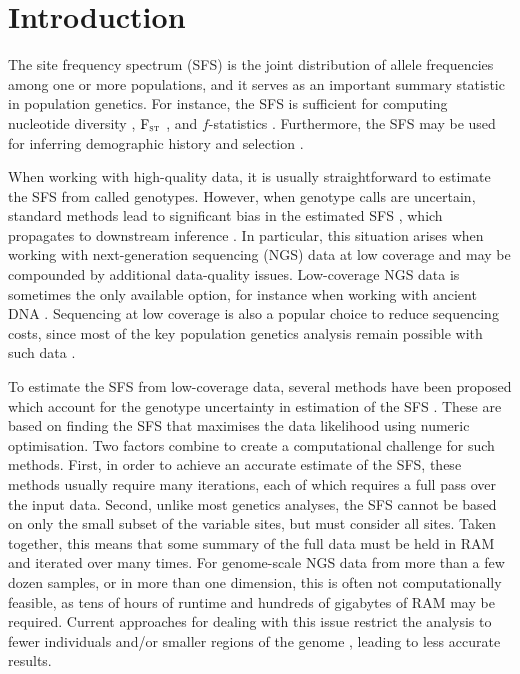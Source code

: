 \section{Introduction}

The site frequency spectrum (SFS) is the joint distribution of allele frequencies among one or more populations, and it serves as an important summary statistic in population genetics.
For instance, the SFS is sufficient for computing nucleotide diversity \cite{Korneliussen2013}, $\text{F}_{\textsc{st}}$ \cite{Bhatia2013}, and $f$-statistics \cite{Peter2016}.
Furthermore, the SFS may be used for inferring demographic history \cite{Marth2004, Gutenkunst2009, Excoffier2013} and selection \cite{Tajima1989, Fay2000, Nielsen2005}.

When working with high-quality data, it is usually straightforward to estimate the SFS from called genotypes.
However, when genotype calls are uncertain, standard methods lead to significant bias in the estimated SFS \cite{Nielsen2011}, which propagates to downstream inference \cite{Han2013}.
In particular, this situation arises when working with next-generation sequencing (NGS) data at low coverage and may be compounded by additional data-quality issues.
Low-coverage NGS data is sometimes the only available option, for instance when working with ancient DNA \cite{Olalde2019,Margaryan2020,vanderValk2021}.
Sequencing at low coverage is also a popular choice to reduce sequencing costs, since most of the key population genetics analysis remain possible with such data \cite{Lou2021}.

To estimate the SFS from low-coverage data, several methods have been proposed which account for the genotype uncertainty in estimation of the SFS \cite{Li2011, Nielsen2011}.
These are based on finding the SFS that maximises the data likelihood using numeric optimisation.
Two factors combine to create a computational challenge for such methods.
First, in order to achieve an accurate estimate of the SFS, these methods usually require many iterations, each of which requires a full pass over the input data.
Second, unlike most genetics analyses, the SFS cannot be based on only the small subset of the variable sites, but must consider all sites.
Taken together, this means that some summary of the full data must be held in RAM and iterated over many times.
For genome-scale NGS data from more than a few dozen samples, or in more than one dimension, this is often not computationally feasible, as tens of hours of runtime and hundreds of gigabytes of RAM may be required.
Current approaches for dealing with this issue restrict the analysis to fewer individuals and/or smaller regions of the genome \cite{SanchezBarreiro2021}, leading to less accurate results.

